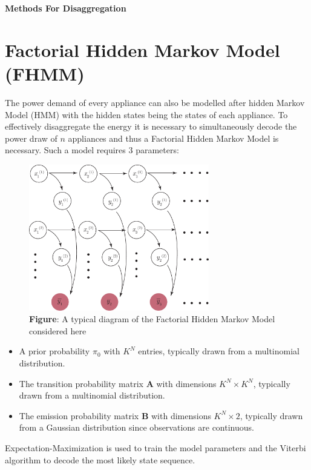 \documentclass[landscape,fontscale=0.48,margin=2cm,paperwidth=135truecm,paperheight=89truecm]{baposter}
\begin{document}
\begin{poster}
\begin{posterbox}[column=1, height = bottom]{\LARGE \bfseries Methods For Disaggregation}
\section*{Factorial Hidden Markov Model (FHMM)}
The power demand of every appliance can also be modelled after hidden Markov Model (HMM) \cite{NILMTK} with the hidden states being the states of each appliance. To effectively disaggregate the energy it is necessary to simultaneously decode the power draw of $n$ appliances and thus a Factorial Hidden Markov Model is necessary. Such a model requires 3 parameters:
%
\begin{figure}
\begin{center}
\includegraphics[width=0.7\textwidth]{FHMM}
\caption*{\footnotesize  \textbf{Figure}: A typical diagram of the Factorial Hidden Markov Model considered here \cite{REDD}} \vspace*{-1 cm}
\end{center}
\end{figure}

\vspace{1em}
\begin{itemize}
    \setlength\itemsep{0.2em}
  \item A prior probability $\pi_0$ with $K^N$ entries, typically drawn from a multinomial distribution. 
  \item The transition probability matrix $\boldsymbol{A}$ with dimensions $K^N\times K^N$, typically drawn from a multinomial distribution.
  \item The emission probability matrix $\boldsymbol{B}$ with dimensions $K^N\times 2$, typically drawn from a Gaussian distribution since observations are continuous. 
\end{itemize}
Expectation-Maximization is used to train the model parameters and the Viterbi algorithm to decode the most likely state sequence.


\end{posterbox}
\end{poster}
\end{document}
